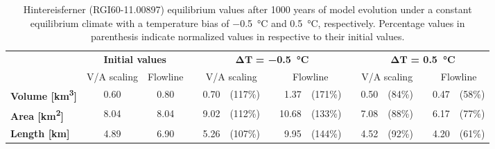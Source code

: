 
        \begin{table}
          \centering
          \caption{Hintereisferner (RGI60-11.00897) equilibrium values after 1000 years of model evolution under a constant equilibrium climate with a temperature bias of \SI{-0.5}{\celsius} and \SI{+0.5}{\celsius}, respectively. Percentage values in parenthesis indicate normalized values in respective to their initial values.}
          \label{tab:hintereisferner_equilibrium_values}
          \begin{tabular}{@{}lcccrlcrlcrlcrl@{}}
            \toprule
            {} & \multicolumn{2}{c}{\textbf{Initial values}} & \phantom{asdf} & \multicolumn{5}{c}{$\bm{\Delta T}$\textbf{ = \SI{-0.5}{\celsius}}} & \phantom{a} & \multicolumn{5}{c}{$\bm{\Delta T}$\textbf{ = \SI{+0.5}{\celsius}}} \\
            \cmidrule{2-3} \cmidrule{5-9} \cmidrule{11-15}
            {} & V/A scaling & Flowline & \phantom {} & \multicolumn{2}{c}{V/A scaling} & \phantom {} & \multicolumn{2}{c}{Flowline} & \phantom{a} & \multicolumn{2}{c}{V/A scaling} & \phantom {} & \multicolumn{2}{c}{Flowline} \\
            \midrule
            \textbf{Volume [\si{\cubic\kilo\meter}]} & 0.60 & 0.80 & &  0.70 & (117\%) & \phantom {} &  1.37 & (171\%) & \phantom{a} &  0.50 & (84\%) & \phantom {} &  0.47 & (58\%) \\
            \textbf{Area [\si{\square\kilo\meter}]} & 8.04 & 8.04 & &  9.02 & (112\%) & \phantom {} &  10.68 & (133\%) & \phantom{a} &  7.08 & (88\%) & \phantom {} &  6.17 & (77\%) \\
            \textbf{Length [\si{\kilo\meter}]} & 4.89 & 6.90 & & 5.26 & (107\%) & \phantom {} &  9.95 & (144\%) & \phantom{a} &  4.52 & (92\%) & \phantom {} &  4.20 & (61\%) \\
            \bottomrule
          \end{tabular}
        \end{table}


